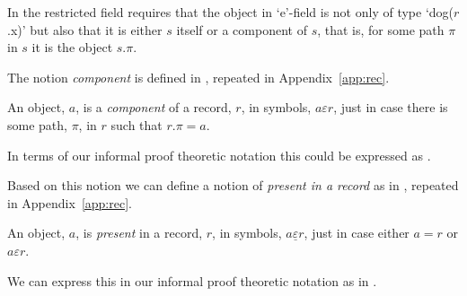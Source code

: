 In  the restricted field\label{pg:restfld}
 requires that the
object in `e'-field is not only of type `dog($r$.x)' but also that it
is either $s$ itself or a component of $s$, that is, for some
path $\pi$ in $s$ it is the object $s.\pi$.\label{pg:component}
\begin{shaded}
The notion \textit{component} is defined in \nexteg{}, repeated in 
Appendix~\ref{app:rec}.
\begin{ex} 
An object, $a$, is a \textit{component} of a record, $r$, in symbols,
$a\varepsilon r$, just in case there is some path, $\pi$, in $r$ such
that $r.\pi=a$. 
\end{ex}

In terms of our informal proof theoretic notation this could be
expressed as \nexteg{}.
\begin{ex} 
\begin{subex} 
 
\item
  \begin{prooftree}
  \end{prooftree}
 
\item
  \begin{prooftree}
  \end{prooftree}
  \hspace*{2em}
  \begin{prooftree}
  \end{prooftree}
  
    
 
\end{subex} 
   
\end{ex}

Based on this notion we can define a notion of \textit{present in a
  record} as in \nexteg{}, repeated in 
Appendix~\ref{app:rec}.\label{pg:present}
\begin{ex} 
An object, $a$, is \textit{present} in a record, $r$, in
symbols, $a\underline{\varepsilon} r$, just in case either $a=r$ or
$a\varepsilon r$. 
\end{ex} 
We can express this in our informal proof theoretic notation as in
\nexteg{}.
\begin{ex} 
\begin{subex} 
 

\end{subex}
\end{ex}
\end{shaded}
